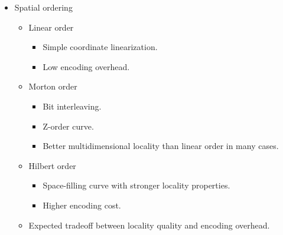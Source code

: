 \begin{itemize}
    \item Spatial ordering
    \begin{itemize}
        \item Linear order
        \begin{itemize}
            \item Simple coordinate linearization.
            \item Low encoding overhead.
        \end{itemize}
        \item Morton order
        \begin{itemize}
            \item Bit interleaving.
            \item Z-order curve.
            \item Better multidimensional locality than linear order in many cases.
        \end{itemize}
        \item Hilbert order
        \begin{itemize}
            \item Space-filling curve with stronger locality properties.
            \item Higher encoding cost.
        \end{itemize}
        \item Expected tradeoff between locality quality and encoding overhead.
    \end{itemize}
\end{itemize}


